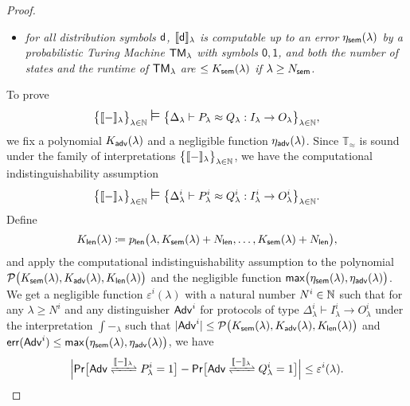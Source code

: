 \begin{proof}
\begin{itemize}
\begin{itemize}
\item \emph{for all distribution symbols $\mathsf{d}$, $\llbracket \mathsf{d} \rrbracket_\lambda$ is computable up to an error $\eta_{\mathsf{sem}}(\lambda)$ by a probabilistic Turing Machine $\mathsf{TM}_\lambda$ with symbols $\mathsf{0}, \mathsf{1}$, and both the number of states and the runtime of $\mathsf{TM}_\lambda$ are $\leq K_{\mathsf{sem}}(\lambda)$ if $\lambda \geq N_{\mathsf{sem}}$.}
\end{itemize}
\end{itemize}

\noindent To prove
\[\big\{\int{-}_\lambda\big\}_{\lambda \in \nat} \; \mathlarger{\mathlarger{\vDash}} \; \big\{\Delta_\lambda \vdash P_\lambda \approx Q_\lambda : I_\lambda \to O_\lambda\big\}_{\lambda \in \nat},\]
we fix a polynomial $K_{\mathsf{adv}}(\lambda)$ and a negligible function $\eta_{\mathsf{adv}}(\lambda)$. Since $\mathbb{T}_\approx$ is sound under the family of interpretations $\big\{\llbracket - \rrbracket_\lambda\big\}_{\lambda \in \mathbb{N}}$, we have the computational indistinguishability assumption
\[\big\{\int{-}_\lambda\big\}_{\lambda \in \nat} \; \mathlarger{\mathlarger{\vDash}} \; \big\{\Delta^i_\lambda \vdash P^i_\lambda \approx Q^i_\lambda : I^i_\lambda \to O^i_\lambda\big\}_{\lambda \in \nat}.\]
Define
\[ K_{\mathsf{len}}(\lambda) \coloneqq p_{\mathsf{len}}\big(\lambda,K_{\mathsf{sem}}(\lambda) + N_{\mathsf{len}},\ldots,K_{\mathsf{sem}}(\lambda) + N_{\mathsf{len}}\big),\]
and apply the computational indistinguishability assumption to the polynomial $\mathcal{P}\big(K_{\mathsf{sem}}(\lambda),K_{\mathsf{adv}}(\lambda),K_{\mathsf{len}}(\lambda)\big)$ and the negligible function $\mathsf{max}\big(\eta_{\mathsf{sem}}(\lambda),\eta_{\mathsf{adv}}(\lambda)\big)$. We get a negligible function $\varepsilon^i(\lambda)$ with a natural number $N^i \in \mathbb{N}$ such that for any $\lambda \geq N^i$ and any distinguisher $\mathsf{Adv}^i$ for protocols of type $\Delta^i_\lambda \vdash I^i_\lambda \to O^i_\lambda$ under the interpretation $\int{-}_\lambda$ such that $|\mathsf{Adv}^i| \leq \mathcal{P}\big(K_{\mathsf{sem}}(\lambda),K_{\mathsf{adv}}(\lambda),K_{\mathsf{len}}(\lambda)\big)$ and $\mathsf{err}(\mathsf{Adv}^i) \leq \mathsf{max}\big(\eta_{\mathsf{sem}}(\lambda),\eta_{\mathsf{adv}}(\lambda)\big)$, we have
\[\Big|\mathsf{Pr}\big[\interaction{\Adv}{P^i_\lambda}{\int{-}_\lambda} = 1\big] - \mathsf{Pr}\big[\interaction{\Adv}{Q^i_\lambda}{\int{-}_\lambda} = 1\big]\Big| \leq \varepsilon^i(\lambda).\]%


\end{proof}
